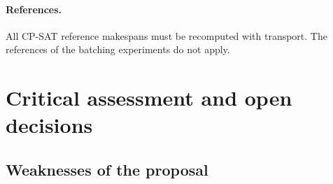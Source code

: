 \documentclass[11pt,a4paper]{article}
\begin{document}
\paragraph{References.} All CP-SAT reference makespans must be recomputed with
transport. The references of the batching experiments do not apply.

\section{Critical assessment and open decisions}
\label{sec:critique}

\subsection{Weaknesses of the proposal}
\end{document}

